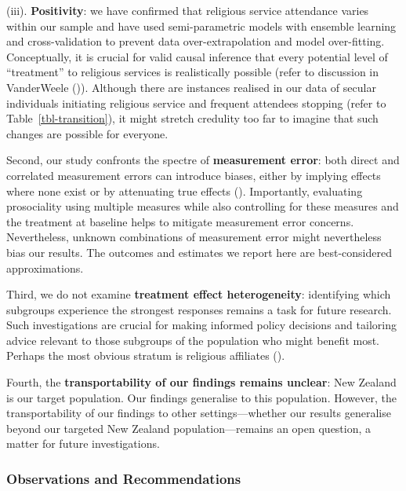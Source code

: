 \documentclass[
  single column]{article}
\begin{document}
(iii). \textbf{Positivity}: we have confirmed that religious service
attendance varies within our sample and have used semi-parametric models
with ensemble learning and cross-validation to prevent data
over-extrapolation and model over-fitting. Conceptually, it is crucial
for valid causal inference that every potential level of ``treatment''
to religious services is realistically possible (refer to discussion in
VanderWeele ()).
Although there are instances realised in our data of secular individuals
initiating religious service and frequent attendees stopping (refer to
Table~\ref{tbl-transition}), it might stretch credulity too far to
imagine that such changes are possible for everyone.

Second, our study confronts the spectre of \textbf{measurement error}:
both direct and correlated measurement errors can introduce biases,
either by implying effects where none exist or by attenuating true
effects (). Importantly, evaluating prosociality using multiple
measures while also controlling for these measures and the treatment at
baseline helps to mitigate measurement error concerns. Nevertheless,
unknown combinations of measurement error might nevertheless bias our
results. The outcomes and estimates we report here are best-considered
approximations.

Third, we do not examine \textbf{treatment effect heterogeneity}:
identifying which subgroups experience the strongest responses remains a
task for future research. Such investigations are crucial for making
informed policy decisions and tailoring advice relevant to those
subgroups of the population who might benefit most. Perhaps the most
obvious stratum is religious affiliates
().

Fourth, the \textbf{transportability of our findings remains unclear}:
New Zealand is our target population. Our findings generalise to this
population. However, the transportability of our findings to other
settings---whether our results generalise beyond our targeted New
Zealand population---remains an open question, a matter for future
investigations.

\subsubsection{Observations and
Recommendations}\label{observations-and-recommendations}
\end{document}
